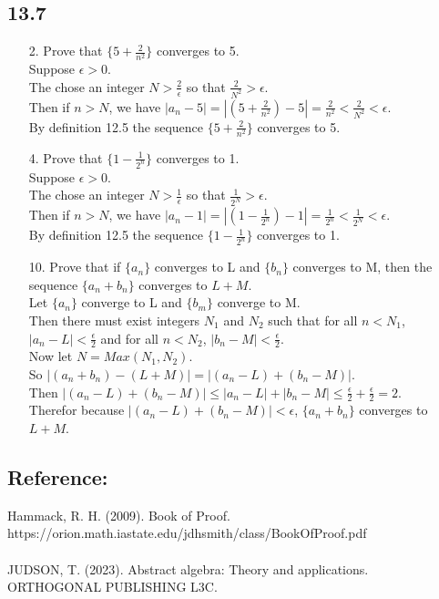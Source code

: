 \documentclass[sigconf]{article}
\begin{document}
\subsection*{13.7}
\begin{itemize}
  \item[2.] Prove that $\{5+\frac{2}{n^2}\}$ converges to 5.\\
            Suppose $\epsilon>0$.\\
            The chose an integer $N>\frac{2}{\epsilon}$ so that $\frac{2}{N^2}>\epsilon$.\\
            Then if $n>N$, we have $|a_n-5|=|(5+\frac{2}{n^2})-5|=\frac{2}{n^2}<\frac{2}{N^2}<\epsilon$.\\
            By definition 12.5 the sequence $\{5+\frac{2}{n^2}\}$ converges to 5.
  \item[4.] Prove that $\{1-\frac{1}{2^n}\}$ converges to 1.\\
            Suppose $\epsilon>0$.\\
            The chose an integer $N>\frac{1}{\epsilon}$ so that $\frac{1}{2^N}>\epsilon$.\\
            Then if $n>N$, we have $|a_n-1|=|(1-\frac{1}{2^n})-1|=\frac{1}{2^n}<\frac{1}{2^N}<\epsilon$.\\
            By definition 12.5 the sequence $\{1-\frac{1}{2^n}\}$ converges to 1.
  \item[10.] Prove that if $\{a_n\}$ converges to L and $\{b_n\}$ converges to M, then the sequence $\{a_n+b_n\}$ converges to $L+M$.\\
            Let $\{a_n\}$ converge to L and $\{b_m\}$ converge to M.\\
            Then there must exist integers $N_1$ and $N_2$ such that for all $n<N_1$, $|a_n-L|<\frac{\epsilon}{2}$ and for all $n<N_2$, $|b_n-M|<\frac{\epsilon}{2}$.\\
            Now let $N=Max(N_1,N_2)$.\\
            So $|(a_n+b_n)-(L+M)|=|(a_n-L)+(b_n-M)|$.\\
            Then $|(a_n-L)+(b_n-M)|\leq|a_n-L|+|b_n-M|\leq\frac{\epsilon}{2}+\frac{\epsilon}{2}=2$.\\
            Therefor because $|(a_n-L)+(b_n-M)|<\epsilon$, $\{a_n+b_n\}$ converges to $L+M$.
\end{itemize}



\subsection*{Reference:}
Hammack, R. H. (2009). Book of Proof.\\ https://orion.math.iastate.edu/jdhsmith/class/BookOfProof.pdf
\\
\\
JUDSON, T. (2023). Abstract algebra: Theory and applications. ORTHOGONAL PUBLISHING L3C.



\end{document}
